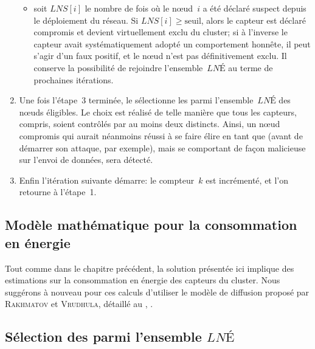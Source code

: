 \begin{enumerate}
\begin{itemize}
            \item soit $\mathit{LNS}[i]$ le nombre de fois où le nœud~$i$ a été déclaré suspect depuis le déploiement du réseau. Si $\mathit{LNS}[i] \ge \mathrm{seuil}$, alors le capteur est déclaré compro\-mis et devient virtuellement exclu du cluster; si à l'inverse le capteur avait systématiquement adopté un comportement honnête, il peut s'agir d'un faux positif, et le nœud n'est pas définitivement exclu. Il conserve la possibilité de rejoindre l'ensemble~$\mathit{LNÉ}$ au terme de prochaines itérations.
        \end{itemize}
    \item Une fois l'étape~3 terminée, le \CH sélectionne les \cns parmi l'ensemble~$\mathit{LNÉ}$ des nœuds éligibles. Le choix est réalisé de telle manière que tous les capteurs, \cns compris, soient contrôlés par au moins deux \cns distincts. Ainsi, un nœud compromis qui aurait néanmoins réussi à se faire élire en tant que \cn (avant de démarrer son attaque, par exemple), mais se comportant de façon malicieuse sur l'envoi de données, sera détecté.
    \item Enfin l'itération suivante démarre: le compteur~$k$ est incrémenté, et l'on retourne à l'étape~1.
\end{enumerate}

    \subsection{Modèle mathématique pour la consommation en énergie}

Tout comme dans le chapitre précédent, la solution présentée ici implique des estimations sur la consommation en énergie des capteurs du cluster.
Nous suggérons à nouveau pour ces calculs d'utiliser le modèle de diffusion proposé par \textsc{Rakhmatov} et \textsc{Vrudhula}, détaillé au , .

    \subsection{Sélection des \cns parmi l'ensemble $\mathit{LNÉ}$}\label{sd:ssec:selec}

